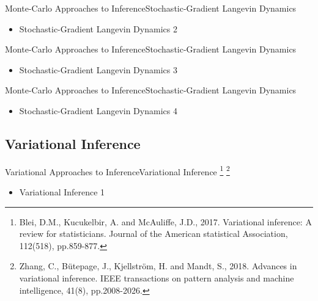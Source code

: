 \documentclass[AERbeamer%
              ,optEnglish%
              ,optBiber%
              ,optBibstyleAlphabetic%
              ,optBeamerClassicFormat%
              ]{AERlatex}%
\begin{document}
\begin{frame}[c]{Monte-Carlo Approaches to Inference}{Stochastic-Gradient Langevin Dynamics}
    \centering
    \begin{itemize}
        \item Stochastic-Gradient Langevin Dynamics 2
    \end{itemize}
\end{frame}


\begin{frame}[c]{Monte-Carlo Approaches to Inference}{Stochastic-Gradient Langevin Dynamics}
    \centering
    \begin{itemize}
        \item Stochastic-Gradient Langevin Dynamics 3
    \end{itemize}
\end{frame}


\begin{frame}[c]{Monte-Carlo Approaches to Inference}{Stochastic-Gradient Langevin Dynamics}
    \centering
    \begin{itemize}
        \item Stochastic-Gradient Langevin Dynamics 4
    \end{itemize}
\end{frame}



\subsection{Variational Inference}

\begin{frame}[c]{Variational Approaches to Inference}{Variational Inference \footnote{Blei, D.M., Kucukelbir, A. and McAuliffe, J.D., 2017. Variational inference: A
                                                                                      review for statisticians. Journal of the American statistical Association, 112(518),
                                                                                      pp.859-877.}
                                                                            \footnote{Zhang, C., Bütepage, J., Kjellström, H. and Mandt, S., 2018. Advances in variational inference.
                                                                                      IEEE transactions on pattern analysis and machine intelligence, 41(8), pp.2008-2026.}}
    \centering
    \begin{itemize}
        \item Variational Inference 1
    \end{itemize}
\end{frame}
\end{document}
